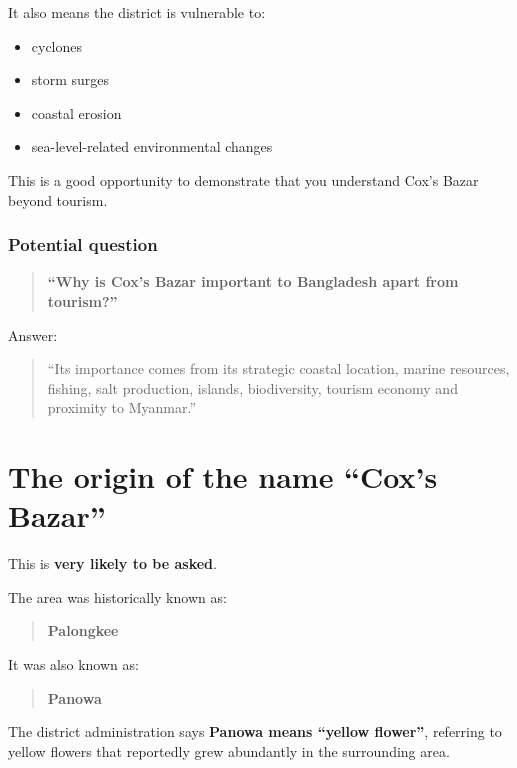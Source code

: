It also means the district is vulnerable to:

\begin{itemize}
  \item cyclones
  \item storm surges
  \item coastal erosion
  \item sea-level-related environmental changes
\end{itemize}

This is a good opportunity to demonstrate that you understand Cox's Bazar beyond tourism.

\subsubsection{Potential question}

\begin{quote}
\textbf{``Why is Cox's Bazar important to Bangladesh apart from tourism?''}\\
\end{quote}

Answer:

\begin{quote}
``Its importance comes from its strategic coastal location, marine resources, fishing, salt production, islands, biodiversity, tourism economy and proximity to Myanmar.''\\
\end{quote}

\medskip

\section{The origin of the name ``Cox's Bazar''}

This is \textbf{very likely to be asked}.

The area was historically known as:

\begin{quote}
\textbf{Palongkee}\\
\end{quote}

It was also known as:

\begin{quote}
\textbf{Panowa}\\
\end{quote}

The district administration says \textbf{Panowa means ``yellow flower''}, referring to yellow flowers that reportedly grew abundantly in the surrounding area.

